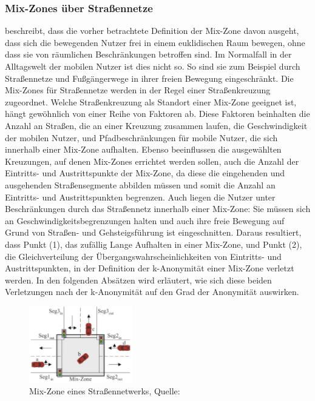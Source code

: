 \subsubsection{Mix-Zones über Straßennetze}
\cite{Palanisamy2011} beschreibt, dass die vorher betrachtete Definition der Mix-Zone davon ausgeht, dass sich die bewegenden Nutzer frei in einem euklidischen Raum bewegen, ohne dass sie von räumlichen Beschränkungen betroffen sind. Im Normalfall in der Alltagswelt der mobilen Nutzer ist dies nicht so. So sind sie zum Beispiel durch Straßennetze und Fußgängerwege in ihrer freien Bewegung eingeschränkt. Die Mix-Zones für Straßennetze werden in der Regel einer Straßenkreuzung zugeordnet. Welche Straßenkreuzung als Standort einer Mix-Zone geeignet ist, hängt gewöhnlich von einer Reihe von Faktoren ab. Diese Faktoren beinhalten die Anzahl an Straßen, die an einer Kreuzung zusammen laufen, die Geschwindigkeit der mobilen Nutzer, und Pfadbeschränkungen für mobile Nutzer, die sich innerhalb einer Mix-Zone aufhalten. Ebenso beeinflussen die ausgewählten Kreuzungen, auf denen Mix-Zones errichtet werden sollen, auch die Anzahl der Eintritts- und Austrittspunkte der Mix-Zone, da diese die eingehenden und ausgehenden Straßensegmente abbilden müssen und somit die Anzahl an Eintritts- und Austrittspunkten begrenzen. Auch liegen die Nutzer unter Beschränkungen durch das Straßennetz innerhalb einer Mix-Zone: Sie müssen sich an Geschwindigkeitsbegrenzungen halten und auch ihre freie Bewegung auf Grund von Straßen- und Gehsteigsführung ist eingeschnitten. Daraus resultiert, dass Punkt (1), das zufällig Lange Aufhalten in einer Mix-Zone, und Punkt (2), die Gleichverteilung der Übergangswahrscheinlichkeiten von Eintritts- und Austrittspunkten, in der Definition der k-Anonymität einer Mix-Zone verletzt werden. In den folgenden Absätzen wird erläutert, wie sich diese beiden Verletzungen nach \cite{Chow2011} der k-Anonymität auf den Grad der Anonymität auswirken.

\begin{figure}[!h]
		\centering
		\includegraphics[width=0.4\textwidth]{Bilder/MixZoneNetwork.PNG}
		\caption{Mix-Zone eines Straßennetwerks, Quelle: \protect\cite{Chow2011}}
		\label{fig_MixSrasse}
	\end{figure}

